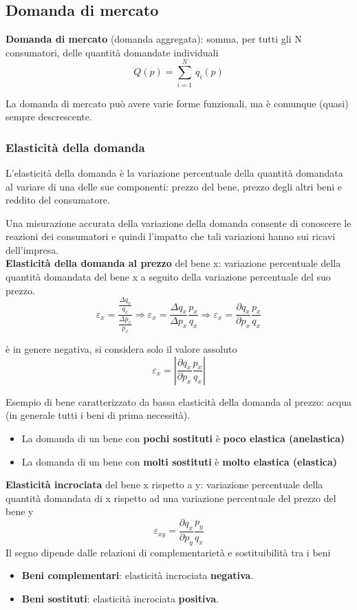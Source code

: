 \documentclass[../main.tex]{subfiles}
\begin{document}
\subsection{Domanda di mercato}

\textbf{Domanda di mercato} (domanda aggregata): somma, per tutti gli N consumatori, delle quantità domandate individuali
$$Q(p) = \sum_{i=1}^N\,q_i(p)$$

La domanda di mercato può avere varie forme funzionali, ma è comunque (quasi) sempre descrescente.

\subsubsection{Elasticità della domanda}

L'elasticità della domanda è la variazione percentuale della quantità domandata al variare di una delle sue componenti: prezzo del bene, prezzo degli altri beni e reddito del consumatore.

Una misurazione accurata della variazione della domanda consente di conoscere le reazioni dei consumatori e quindi l'impatto che tali variazioni hanno sui ricavi dell'impresa.\\

\textbf{Elasticità della domanda al prezzo} del bene x: variazione percentuale della quantità domandata del bene x a seguito della variazione percentuale del suo prezzo.
$$
\varepsilon_x=\frac{\frac{\Delta q_x}{q_x}}{\frac{\Delta p_x}{p_x}}\Rightarrow\varepsilon_x=\frac{\Delta q_x}{\Delta p_x}\frac{p_x}{q_x}\Rightarrow\varepsilon_x=\frac{\partial q_x}{\partial p_x}\frac{p_x}{q_x}
$$

è in genere negativa, si considera solo il valore assoluto
$$
\varepsilon_x = |\frac{\partial q_x}{\partial p_x}\frac{p_x}{q_x}|
$$

Esempio di bene caratterizzato da bassa elasticità della domanda al prezzo: acqua (in generale tutti i beni di prima necessità).

\begin{itemize}
\item La domanda di un bene con \textbf{pochi sostituti} è \textbf{poco elastica (anelastica)}
\item La domanda di un bene con \textbf{molti sostituti} è \textbf{molto elastica (elastica)}\\
\end{itemize}

\textbf{Elasticità incrociata} del bene x rispetto a y: variazione percentuale della quantità domandata di x rispetto ad una variazione percentuale del prezzo del bene y
$$\varepsilon_{xy}=\frac{\partial q_x}{\partial p_y}\frac{p_y}{q_x}$$
Il segno dipende dalle relazioni di complementarietà e sostituibilità tra i beni
\begin{itemize}
\item \textbf{Beni complementari}: elasticità incrociata \textbf{negativa}.
\item \textbf{Beni sostituti}: elasticità incrociata \textbf{positiva}.\\
\end{itemize}
\end{document}
